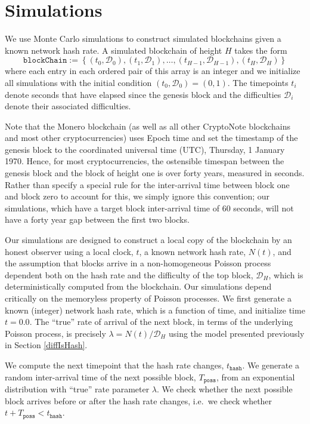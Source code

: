 \documentclass[12pt,english]{mrl}
\theoremstyle{definition}
\numberwithin{equation}{section}
\numberwithin{figure}{section}
\numberwithin{equation}{section}
\numberwithin{equation}{section}
\numberwithin{figure}{section}
\begin{document}
\section{Simulations}\label{simulations}

We use Monte Carlo simulations to construct simulated blockchains given a known network hash rate. A simulated blockchain of height $H$ takes the form
\[\texttt{blockChain}:=\left\{(t_{0}, \mathcal{D}_{0}), (t_{1}, \mathcal{D}_{1}), \ldots, (t_{H-1}, \mathcal{D}_{H-1}), (t_{H}, \mathcal{D}_{H})\right\}\]
where each entry in each ordered pair of this array is an integer and we initialize all simulations with the initial condition $(t_0, \mathcal{D}_0) = (0, 1)$. The timepoints $t_i$ denote seconds that have elapsed since the genesis block and the difficulties $\mathcal{D}_i$ denote their associated difficulties. 

Note that the Monero blockchain (as well as all other CryptoNote blockchains and most other cryptocurrencies) uses Epoch time and set the timestamp of the genesis block to the coordinated universal time (UTC), Thursday, 1 January 1970. Hence, for most cryptocurrencies, the ostensible timespan between the genesis block and the block of height one is over forty years, measured in seconds. Rather than specify a special rule for the inter-arrival time between block one and block zero to account for this, we simply ignore this convention; our simulations, which have a target block inter-arrival time of $60$ seconds, will not have a forty year gap between the first two blocks.

Our simulations are designed to construct a local copy of the blockchain by an honest observer using a local clock, $t$, a known network hash rate, $N(t)$, and the assumption that blocks arrive in a non-homogeneous Poisson process dependent both on the hash rate and the difficulty of the top block, $\mathcal{D}_H$, which is deterministically computed from the blockchain. Our simulations depend critically on the memoryless property of Poisson processes. We first generate a known (integer) network hash rate, which is a function of time, and initialize time $t=0.0$. The ``true'' rate of arrival of the next block, in terms of the underlying Poisson process, is precisely $\lambda = N(t)/\mathcal{D}_H$ using the model presented previously in Section \ref{diffIsHash}. 

We compute the next timepoint that the hash rate changes, $t_{\texttt{hash}}$. We generate a random inter-arrival time of the next possible block, $T_{\texttt{poss}}$, from an exponential distribution with ``true'' rate parameter $\lambda$. We check whether the next possible block arrives before or after the hash rate changes, i.e.\ we check whether $t + T_{\texttt{poss}} < t_{\texttt{hash}}$. 
\end{document}
